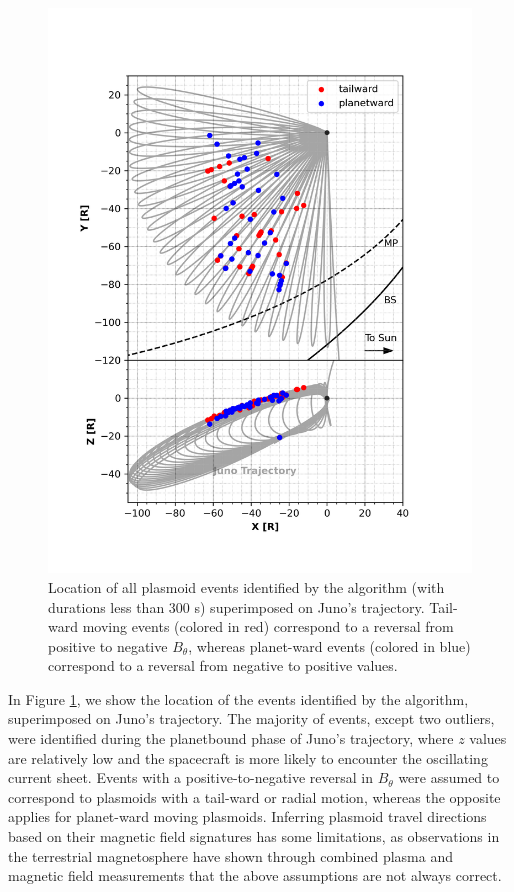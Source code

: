 \begin{figure}
    \centering
    \includegraphics{images6/TrajectoryLocationofEvent_motion.png}
    \caption{Location of all plasmoid events identified by the algorithm (with durations less than 300 s) superimposed on Juno's trajectory. Tail-ward moving events (colored in red) correspond to a reversal from positive to negative $B_\theta$, whereas planet-ward events (colored in blue) correspond to a reversal from negative to positive values.}
    \label{fig:trajectory-plasmoid-motion}
\end{figure}

In Figure \ref{fig:trajectory-plasmoid-motion}, we show the location of the events identified by the algorithm, superimposed on Juno's trajectory. The majority of events, except two outliers, were identified during the planetbound phase of Juno's trajectory, where $z$ values are relatively low and the spacecraft is more likely to encounter the oscillating current sheet. Events with a positive-to-negative reversal in $B_\theta$ were assumed to correspond to plasmoids with a tail-ward or radial motion, whereas the opposite applies for planet-ward moving plasmoids. Inferring plasmoid travel directions based on their magnetic field signatures has some limitations, as observations in the terrestrial magnetosphere have shown through combined plasma and magnetic field measurements that the above assumptions are not always correct. 

